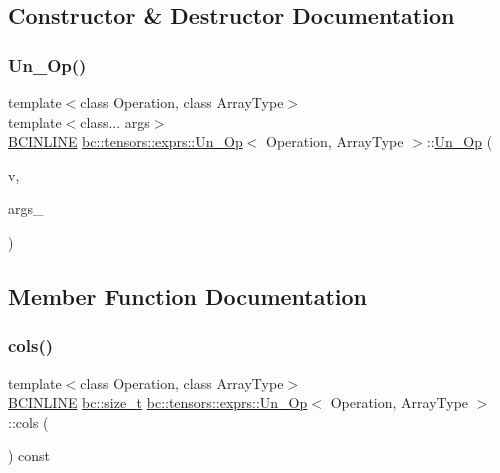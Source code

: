 \subsection{Constructor \& Destructor Documentation}
\mbox{\label{structbc_1_1tensors_1_1exprs_1_1Un__Op_a85fa628d6bfe8068582f86b04e99b910}} 
\subsubsection{\texorpdfstring{Un\+\_\+\+Op()}{Un\_Op()}}
{\footnotesize\ttfamily template$<$class Operation, class Array\+Type$>$ \\
template$<$class... args$>$ \\
\hyperlink{common_8h_a6699e8b0449da5c0fafb878e59c1d4b1}{B\+C\+I\+N\+L\+I\+NE} \hyperlink{structbc_1_1tensors_1_1exprs_1_1Un__Op}{bc\+::tensors\+::exprs\+::\+Un\+\_\+\+Op}$<$ Operation, Array\+Type $>$\+::\hyperlink{structbc_1_1tensors_1_1exprs_1_1Un__Op}{Un\+\_\+\+Op} (\begin{DoxyParamCaption}\item[{Array\+Type}]{v,  }\item[{const args \&...}]{args\+\_\+ }\end{DoxyParamCaption})\hspace{0.3cm}{\ttfamily [inline]}}



\subsection{Member Function Documentation}
\mbox{\label{structbc_1_1tensors_1_1exprs_1_1Un__Op_a5a5fc191a679863e8f5e568201883e58}} 
\subsubsection{\texorpdfstring{cols()}{cols()}}
{\footnotesize\ttfamily template$<$class Operation, class Array\+Type$>$ \\
\hyperlink{common_8h_a6699e8b0449da5c0fafb878e59c1d4b1}{B\+C\+I\+N\+L\+I\+NE} \hyperlink{namespacebc_aaf8e3fbf99b04b1b57c4f80c6f55d3c5}{bc\+::size\+\_\+t} \hyperlink{structbc_1_1tensors_1_1exprs_1_1Un__Op}{bc\+::tensors\+::exprs\+::\+Un\+\_\+\+Op}$<$ Operation, Array\+Type $>$\+::cols (\begin{DoxyParamCaption}{ }\end{DoxyParamCaption}) const\hspace{0.3cm}{\ttfamily [inline]}}

